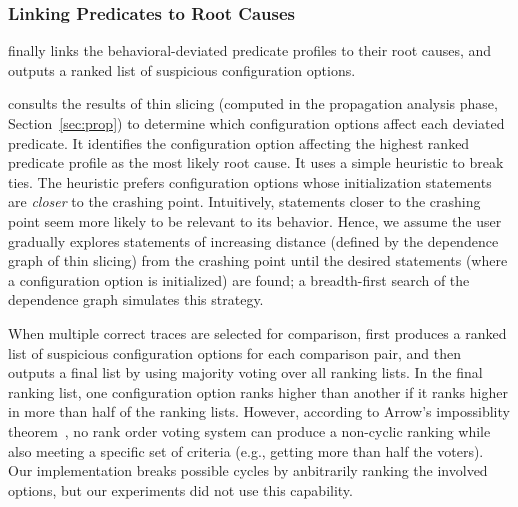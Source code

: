 \subsubsection{Linking Predicates to Root Causes}
\label{sec:linking}


\ourtool finally links the behavioral-deviated
predicate profiles to their root causes, and outputs a ranked list of suspicious
configuration options.

\ourtool consults the results of thin slicing (computed in the propagation
analysis phase, Section~\ref{sec:prop}) to determine which
configuration options affect each deviated predicate.
It identifies the configuration option
affecting the highest ranked predicate profile as the most likely
root cause.  It uses a simple heuristic to break ties.
The heuristic prefers configuration options whose initialization
statements are \textit{closer} to the
crashing point. Intuitively, statements closer to the
crashing point seem more likely to be relevant to its behavior.
Hence, we assume the user gradually explores statements of
increasing distance (defined by the dependence graph of thin slicing)
from the crashing point until the desired statements (where a configuration
option is initialized) are found; a breadth-first
search of the dependence graph simulates this strategy.


When multiple correct traces are selected for comparison,
\ourtool first produces a ranked list of suspicious
configuration options for each comparison pair, and then outputs
a final list by using majority voting over all ranking lists.
In the final ranking list, one configuration option ranks higher
than another if it ranks higher in more than half of the ranking lists.
However, according to Arrow's impossiblity theorem~\cite{Fishburn1970103},
no rank order voting system can produce a non-cyclic ranking while also
meeting a specific set of criteria (e.g., getting more than half the voters).
Our implementation breaks possible cycles by anbitrarily ranking the
involved options, but our experiments did not use this capability.



